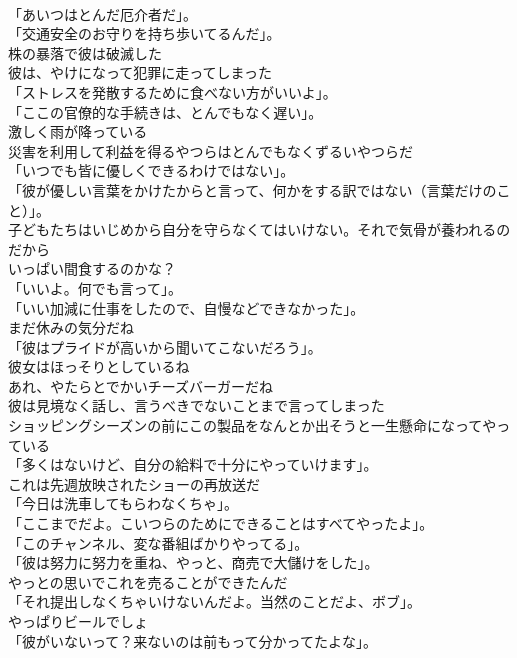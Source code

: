 \documentclass[8pt]{extreport}
\begin{document}
\begin{CJK}{UTF8}{min}
\\	「あいつはとんだ厄介者だ」。	
\\	「交通安全のお守りを持ち歩いてるんだ」。	
\\	株の暴落で彼は破滅した	
\\	彼は、やけになって犯罪に走ってしまった	
\\	「ストレスを発散するために食べない方がいいよ」。	
\\	「ここの官僚的な手続きは、とんでもなく遅い」。	
\\	激しく雨が降っている	
\\	災害を利用して利益を得るやつらはとんでもなくずるいやつらだ	
\\	「いつでも皆に優しくできるわけではない」。	
\\	「彼が優しい言葉をかけたからと言って、何かをする訳ではない（言葉だけのこと）」。	
\\	子どもたちはいじめから自分を守らなくてはいけない。それで気骨が養われるのだから	
\\	いっぱい間食するのかな？	
\\	「いいよ。何でも言って」。	
\\	「いい加減に仕事をしたので、自慢などできなかった」。	
\\	まだ休みの気分だね	
\\	「彼はプライドが高いから聞いてこないだろう」。	
\\	彼女はほっそりとしているね	
\\	あれ、やたらとでかいチーズバーガーだね	
\\	彼は見境なく話し、言うべきでないことまで言ってしまった	
\\	ショッピングシーズンの前にこの製品をなんとか出そうと一生懸命になってやっている	
\\	「多くはないけど、自分の給料で十分にやっていけます」。	
\\	これは先週放映されたショーの再放送だ	
\\	「今日は洗車してもらわなくちゃ」。	
\\	「ここまでだよ。こいつらのためにできることはすべてやったよ」。	
\\	「このチャンネル、変な番組ばかりやってる」。	
\\	「彼は努力に努力を重ね、やっと、商売で大儲けをした」。	
\\	やっとの思いでこれを売ることができたんだ	
\\	「それ提出しなくちゃいけないんだよ。当然のことだよ、ボブ」。	
\\	やっぱりビールでしょ	
\\	「彼がいないって？来ないのは前もって分かってたよな」。	

\end{CJK}
\end{document}
